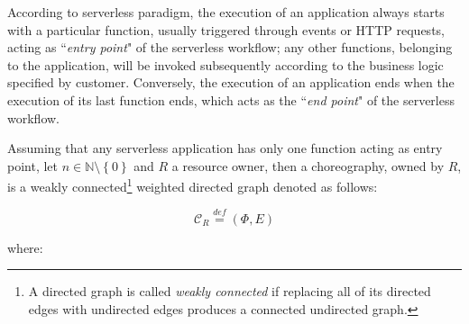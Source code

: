 \documentclass[12pt,a4paper]{report}
\newcommand{\mathDef}{\overset{\textit{def}}{=}}
\newcommand{\N}{\mathbb{N}}
\newcommand{\SetMinusZero}{\setminus \left\{0\right\}}
\begin{document}
According to serverless paradigm, the execution of an application always starts with a particular function, usually triggered through events or HTTP requests, acting as ``\textit{entry point}" of the serverless workflow; any other functions, belonging to the application, will be invoked subsequently according to the business logic specified by customer. Conversely, the execution of an application ends when the execution of its last function ends, which acts as the ``\textit{end point}" of the serverless workflow. 

Assuming that any serverless application has only one function acting as entry point, let $n \in \N \SetMinusZero$ and $R$ a resource owner, then a choreography, owned by $R$, is a weakly connected\footnote{A directed graph is called \textit{weakly connected} if replacing all of its directed edges with undirected edges produces a connected undirected graph.} weighted directed graph denoted as follows:

\begin{equation}
	\mathcal{C}_R \mathDef (\Phi,E)
\end{equation}

where:
\end{document}
